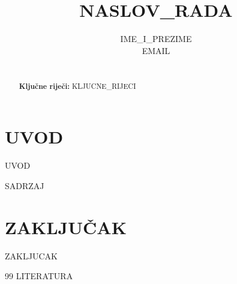 \documentclass[10pt,a4paper,twocolumn]{article}
\title{\vspace{-1.5cm}\Large\bfseries\uppercase{{{NASLOV_RADA}}}}
\author{\normalsize {{IME_I_PREZIME}} \\ \small {{EMAIL}}}
\date{}
\begin{document}
\maketitle

\begin{abstract}
\vspace{0.5cm}\\
\noindent \textbf{Ključne riječi:} {{KLJUCNE_RIJECI}}
\end{abstract}

\section{UVOD}
{{UVOD}}

{{SADRZAJ}}

\section{ZAKLJUČAK}
{{ZAKLJUCAK}}

\begin{thebibliography}{99}
{{LITERATURA}}
\end{thebibliography}
\end{document}
